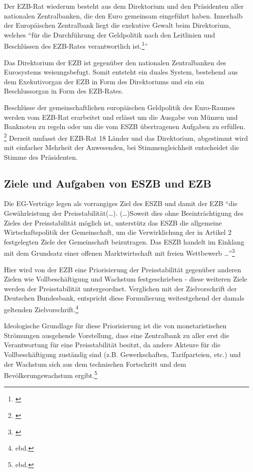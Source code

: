 \documentclass[
        onecolumn,
        a4paper,
        abstracton,
        parskip=half
        ,final
        ]{scrartcl}
\begin{document}
Der EZB-Rat wiederum besteht aus dem Direktorium und den Pr{\"a}sidenten aller nationalen Zentralbanken, die den Euro gemeinsam eingef{\"u}hrt haben. Innerhalb der Europ{\"a}ischen Zentralbank liegt die exekutive Gewalt beim Direktorium, welches "`f{\"u}r die Durchf{\"u}hrung der Geldpolitik nach den Leitlinien und Beschl{\"u}ssen des EZB-Rates verantwortlich ist.\footnote[47]{\citep[S.553]{Basseler2010}}"'

Das Direktorium der EZB ist gegen{\"u}ber den nationalen Zentralbanken des Eurosystems weisungsbefugt. Somit entsteht ein duales System, bestehend aus dem Exekutivorgan der EZB in Form des Direktoriums und ein ein Beschlussorgan in Form des EZB-Rates.

Beschl{\"u}sse der gemeinschaftlichen europ{\"a}ischen Geldpolitik des Euro-Raumes werden vom EZB-Rat erarbeitet und erl{\"a}sst um die Ausgabe von M{\"u}nzen und Banknoten zu regeln oder um die vom ESZB {\"u}bertragenen Aufgaben zu erf{\"u}llen. \footnote[100]{\citep[vgl.][S.553]{Basseler2010}}
Derzeit umfasst der EZB-Rat 18 L{\"a}nder und das Direktorium, abgestimmt wird mit einfacher Mehrheit der Anwesenden, bei Stimmengleichheit entscheidet die Stimme des Pr{\"a}sidenten.


\subsection{Ziele und Aufgaben von ESZB und EZB}  %
Die EG-Vertr{\"a}ge legen als vorrangiges Ziel des ESZB und damit der EZB "`die Gew{\"a}hrleistung der Preisstabilit{\"a}t(\ldots). (\ldots)Soweit dies ohne Beeintr{\"a}chtigung des Zieles der Preisstabilit{\"a}t m{\"o}glich ist, unterst{\"u}tz das ESZB die allgemeine Wirtschaftspolitik der Gemeinschaft, um die Verwirklichung der in Artikel 2 festgelegten Ziele der Gemeinschaft beizutragen. Das ESZB handelt im Einklang mit dem Grundsatz einer offenen Marktwirtschaft mit freien Wettbewerb \ldots"'\footnote[48]{\citep[vgl.][S.554]{Basseler2010}}

Hier wird von der EZB eine Priorisierung der Preisstabilit{\"a}t gegen{\"u}ber anderen Zielen wie Vollbesch{\"a}ftigung und Wachstum festgeschrieben - diese weiteren Ziele werden der Preisstabilit{\"a}t untergeordnet. Verglichen mit der Zielvorschrift der Deutschen Bundesbank, entspricht diese Formulierung weitestgehend der damals geltenden Zielvorschrift.\footnote[49]{ebd.}

Ideologische Grundlage f{\"u}r diese Priorisierung ist die von monetaristischen Str{\"o}mungen ausgehende Vorstellung, dass eine Zentralbank zu aller erst die Verantwortung f{\"u}r eine Preisstabilit{\"a}t besitzt, da andere Akteure f{\"u}r die Vollbesch{\"a}ftigung zust{\"a}ndig sind (z.B. Gewerkschaften, Tarifparteien, etc.) und der Wachstum sich aus dem technischen Fortschritt und dem Bev{\"o}lkerungswachstum ergibt.\footnote[50]{ebd.}
\end{document}
